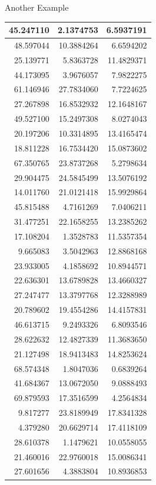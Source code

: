 \documentclass[
  ignorenonframetext,
]{beamer}
\begin{document}
\begin{frame}{Another Example}
\begin{table}
\begin{tabular}[t]{r|r|r}
45.247110 & 2.1374753 & 6.5937191\\
\hline
48.597044 & 10.3884264 & 6.6594202\\
\hline
25.139771 & 5.8363728 & 11.4829371\\
\hline
44.173095 & 3.9676057 & 7.9822275\\
\hline
61.146946 & 27.7834060 & 7.7224625\\
\hline
27.267898 & 16.8532932 & 12.1648167\\
\hline
49.527100 & 15.2497308 & 8.0274043\\
\hline
20.197206 & 10.3314895 & 13.4165474\\
\hline
18.811228 & 16.7534420 & 15.0873602\\
\hline
67.350765 & 23.8737268 & 5.2798634\\
\hline
29.904475 & 24.5845499 & 13.5076192\\
\hline
14.011760 & 21.0121418 & 15.9929864\\
\hline
45.815488 & 4.7161269 & 7.0406211\\
\hline
31.477251 & 22.1658255 & 13.2385262\\
\hline
17.108204 & 1.3528783 & 11.5357354\\
\hline
9.665083 & 3.5042963 & 12.8868168\\
\hline
23.933005 & 4.1858692 & 10.8944571\\
\hline
22.636301 & 13.6789828 & 13.4660327\\
\hline
27.247477 & 13.3797768 & 12.3288989\\
\hline
20.789602 & 19.4554286 & 14.4157831\\
\hline
46.613715 & 9.2493326 & 6.8093546\\
\hline
28.622632 & 12.4827339 & 11.3683650\\
\hline
21.127498 & 18.9413483 & 14.8253624\\
\hline
68.574348 & 1.8047036 & 0.6839264\\
\hline
41.684367 & 13.0672050 & 9.0888493\\
\hline
69.879593 & 17.3516599 & 4.2564834\\
\hline
9.817277 & 23.8189949 & 17.8341328\\
\hline
4.379280 & 20.6629714 & 17.4118109\\
\hline
28.610378 & 1.1479621 & 10.0558055\\
\hline
21.460016 & 22.9760018 & 15.0086341\\
\hline
27.601656 & 4.3883804 & 10.8936853\\

\end{tabular}
\end{table}
\end{frame}
\end{document}
